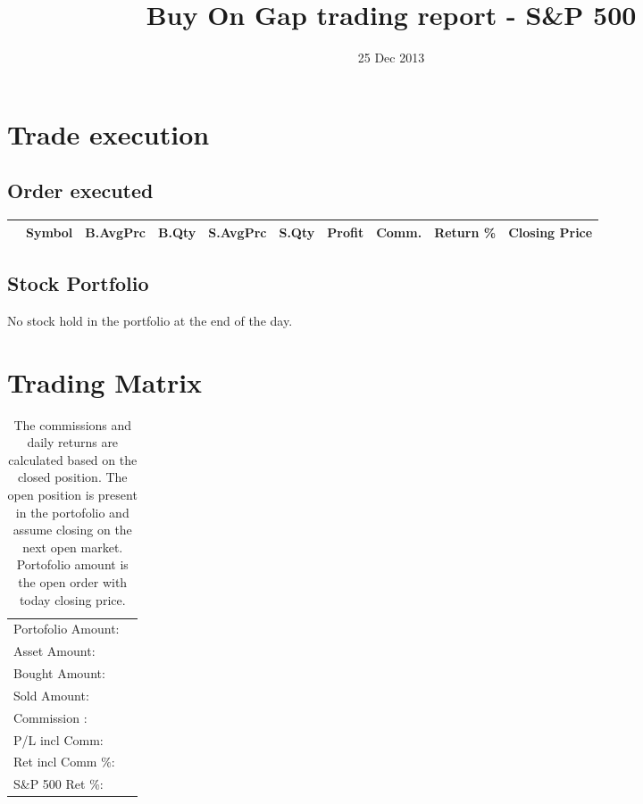 \documentclass{tufte-handout}\usepackage[]{graphicx}\usepackage[]{color}
\title{Buy On Gap trading report - S\&P 500}
\date{ 25 Dec 2013 }
\begin{document}
\maketitle


\section{Trade execution}
\subsection{Order executed}

\begin{table}[ht]
\centering
\begin{tabular}{llrrrrrrr|r}
  \hline
 & Symbol & B.AvgPrc & B.Qty & S.AvgPrc & S.Qty & Profit & Comm. & Return \% & Closing Price \\ 
  \hline
\hline
\end{tabular}
\end{table}



\subsection{Stock Portfolio}
No stock hold in the portfolio at the end of the day.


\section{Trading Matrix}


\begin{table}[ht]
\begin{tabular}{lr}
   \hline
Portofolio Amount: &  \\ 
  Asset Amount: &  \\ 
  Bought Amount: &  \\ 
  Sold   Amount: &  \\ 
  Commission   : &  \\ 
  P/L incl Comm: &  \\ 
  Ret incl Comm \%: &  \\ 
  S\&P 500 Ret \%: &  \\ 
   \hline
\end{tabular}
\caption{The commissions and daily returns are calculated based on the closed position.
The open position is present in the portofolio and assume closing on the next open market.
Portofolio amount is the open order with today closing price.} 
\end{table}
\end{document}

